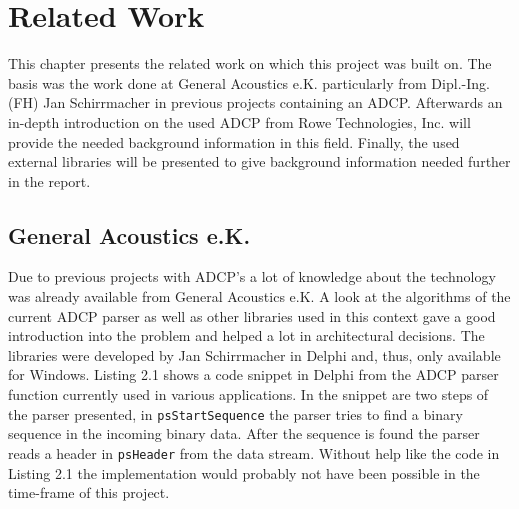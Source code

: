 \chapter{Related Work}
This chapter presents the related work on which this project was built on. The basis was the work done at General Acoustics e.K. particularly from Dipl.-Ing. (FH) Jan Schirrmacher in previous projects containing an ADCP. Afterwards an in-depth introduction on the used ADCP from Rowe Technologies, Inc.\cite{rowe} will provide the needed background information in this field. Finally, the used external libraries will be presented to give background information needed further in the report.

\section{General Acoustics e.K.}
Due to previous projects with ADCP's a lot of knowledge about the technology was already available from General Acoustics e.K. A look at the algorithms of the current ADCP parser as well as other libraries used in this context gave a good introduction into the problem and helped a lot in architectural decisions. The libraries were developed by Jan Schirrmacher in Delphi and, thus, only available for Windows. Listing 2.1 shows a code snippet in Delphi from the ADCP parser function currently used in various applications. In the snippet are two steps of the parser presented, in \texttt{psStartSequence} the parser tries to find a binary sequence in the incoming binary data. After the sequence is found the parser reads a header in \texttt{psHeader} from the data stream. Without help like the code in Listing 2.1 the implementation would probably not have been possible in the time-frame of this project.

